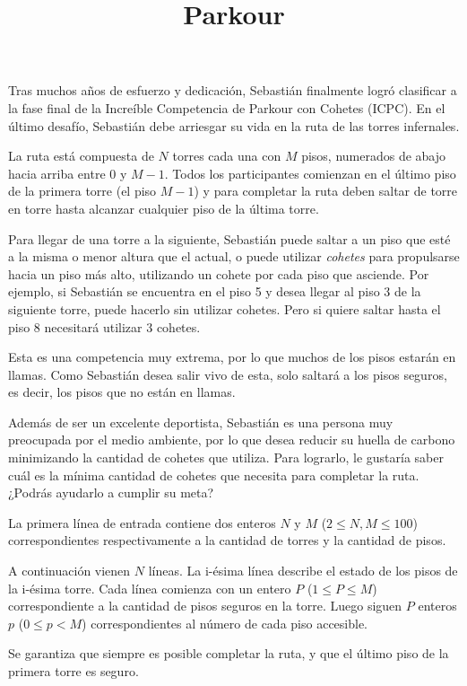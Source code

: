 \documentclass{oci}
\title{Parkour}
\begin{document}
\begin{problemDescription}
  Tras muchos años de esfuerzo y dedicación, Sebastián finalmente logró
  clasificar a la fase final de la Increíble Competencia de Parkour con
  Cohetes (ICPC).
  En el último desafío, Sebastián debe arriesgar
  su vida en la ruta de las torres infernales.

  La ruta está compuesta de $N$ torres cada una con
  $M$ pisos, numerados de abajo hacia arriba entre 0
  y $M-1$.
  Todos los participantes comienzan en el último piso de la primera
  torre (el piso $M-1$) y para completar la ruta deben saltar de torre
  en torre hasta alcanzar cualquier piso de la última torre.

  Para llegar de una torre a la siguiente, Sebastián puede saltar a un piso
  que esté a la misma o menor altura que el actual, o puede utilizar \emph{cohetes}
  para propulsarse hacia un piso más alto, utilizando un cohete por cada piso que asciende.
  Por ejemplo, si Sebastián se encuentra en el piso 5 y desea llegar
  al piso 3 de la siguiente torre, puede hacerlo sin utilizar cohetes.
  Pero si quiere saltar hasta el piso 8 necesitará utilizar 3 cohetes.

  Esta es una competencia muy extrema, por lo que muchos de los pisos
  estarán en llamas.
  Como Sebastián desea salir vivo de esta, solo saltará a los pisos
  seguros, es decir, los pisos que no están en llamas.

  Además de ser un excelente deportista, Sebastián es una persona muy
  preocupada por el medio ambiente, por lo que desea reducir su huella
  de carbono minimizando la cantidad de cohetes que utiliza.
  Para lograrlo, le gustaría saber cuál es la mínima cantidad
  de cohetes que necesita para completar la ruta.
  ¿Podrás ayudarlo a cumplir su meta?

\end{problemDescription}

\begin{inputDescription}
  La primera línea de entrada contiene dos enteros $N$ y $M$ ($2 \leq N, M \leq 100$)
  correspondientes respectivamente a la cantidad de torres y la cantidad de pisos.

  A continuación vienen $N$ líneas.
  La i-ésima línea describe el estado de los pisos de la i-ésima torre.
  Cada línea comienza con un entero $P$ ($1 \leq P \leq M$) correspondiente
  a la cantidad de pisos seguros en la torre.
  Luego siguen $P$ enteros $p$ ($0 \leq p < M$) correspondientes al
  número de cada piso accesible.

  Se garantiza que siempre es posible completar la ruta, y que el
  último piso de la primera torre es seguro.
\end{inputDescription}
\end{document}
